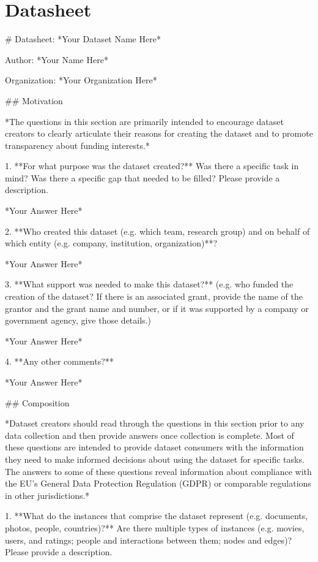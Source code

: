 \newpage
\section{Datasheet}
# Datasheet: *Your Dataset Name Here*

Author: *Your Name Here*

Organization: *Your Organization Here*


## Motivation

*The questions in this section are primarily intended to encourage dataset creators to clearly articulate their reasons for creating the dataset and to promote transparency about funding interests.*

1. **For what purpose was the dataset created?** Was there a specific task in mind? Was there a specific gap that needed to be filled? Please provide a description.

	*Your Answer Here*

2. **Who created this dataset (e.g. which team, research group) and on behalf of which entity (e.g. company, institution, organization)**?

	*Your Answer Here*

3. **What support was needed to make this dataset?** (e.g. who funded the creation of the dataset? If there is an associated grant, provide the name of the grantor and the grant name and number, or if it was supported by a company or government agency, give those details.)

	*Your Answer Here*

4. **Any other comments?**

	*Your Answer Here*


## Composition

*Dataset creators should read through the questions in this section prior to any data collection and then provide answers once collection is complete. Most of these questions are intended to provide dataset consumers with the information they need to make informed decisions about using the dataset for specific tasks. The answers to some of these questions reveal information about compliance with the EU’s General Data Protection Regulation (GDPR) or comparable regulations in other jurisdictions.*

1. **What do the instances that comprise the dataset represent (e.g. documents, photos, people, countries)?** Are there multiple types of instances (e.g. movies, users, and ratings; people and interactions between them; nodes and edges)? Please provide a description.

